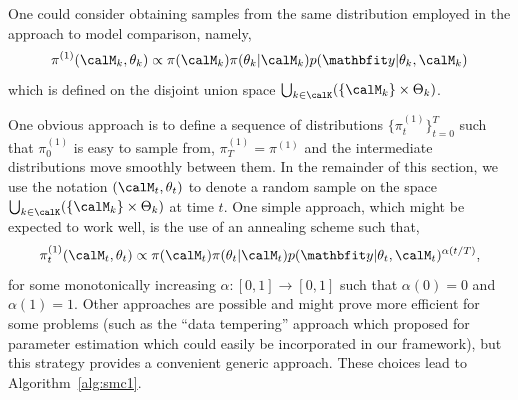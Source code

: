 One could consider obtaining samples from the same distribution employed in
the \rjmcmc approach to model comparison, namely,
\begin{equation}
  \pi^{(1)}(\calM_k,\theta_k) \propto
  \pi(\calM_k)\pi(\theta_k|\calM_k)p(\data|\theta_k,\calM_k)
\end{equation}
which is defined on the disjoint union space
$\bigcup_{k\in\calK}(\{\calM_k\}\times\Theta_k)$.

One obvious \smc approach is to define a sequence of distributions
$\{\pi_t^{(1)}\}_{t=0}^T$ such that $\pi^{(1)}_0$ is easy to sample from,
$\pi_{T}^{(1)} = \pi^{(1)}$ and the intermediate distributions move smoothly
between them. In the remainder of this section, we use the notation
$(\calM_t,\theta_t)$ to denote a random sample on the space
$\bigcup_{k\in\calK}(\{\calM_k\}\times\Theta_k)$ at time $t$. One simple
approach, which might be expected to work well, is the use of an annealing
scheme such that,
\begin{equation}
  \pi^{(1)}_t(\calM_t,\theta_t) \propto \pi(\calM_t)\pi(\theta_t|\calM_t)
  p(\data|\theta_t,\calM_t)^{\alpha(t/T)},
  \label{eq:geometry_1}
\end{equation}
for some monotonically increasing $\alpha:[0,1]\to[0,1]$ such that $\alpha(0)
= 0$ and $\alpha(1) = 1$. Other approaches are possible and might prove more
efficient for some problems (such as the ``data tempering'' approach which
\cite{Chopin:2002hg} proposed for parameter estimation which could easily
be incorporated in our framework), but this strategy provides a convenient
generic approach. These choices lead to Algorithm~\ref{alg:smc1}.



